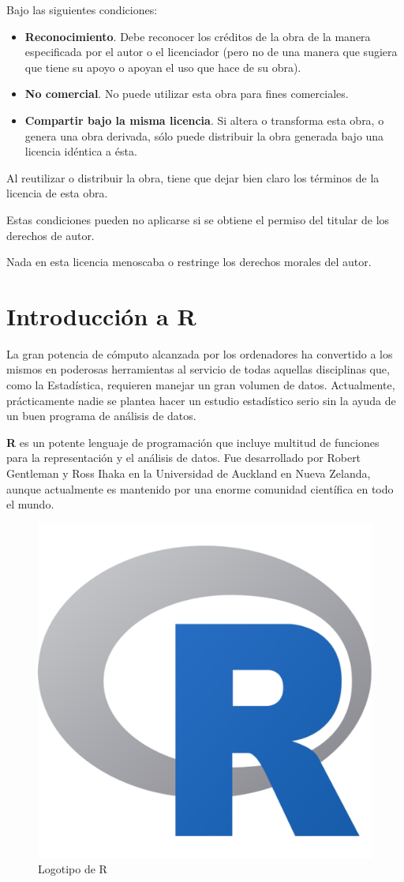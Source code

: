 \documentclass[
  spanish,
  a4paper,
]{scrreport}
\theoremstyle{definition}
\theoremstyle{remark}
\begin{document}
Bajo las siguientes condiciones:

\begin{itemize}
\item
  \textbf{Reconocimiento}. Debe reconocer los créditos de la obra de la
  manera especificada por el autor o el licenciador (pero no de una
  manera que sugiera que tiene su apoyo o apoyan el uso que hace de su
  obra).
\item
  \textbf{No comercial}. No puede utilizar esta obra para fines
  comerciales.
\item
  \textbf{Compartir bajo la misma licencia}. Si altera o transforma esta
  obra, o genera una obra derivada, sólo puede distribuir la obra
  generada bajo una licencia idéntica a ésta.
\end{itemize}

Al reutilizar o distribuir la obra, tiene que dejar bien claro los
términos de la licencia de esta obra.

Estas condiciones pueden no aplicarse si se obtiene el permiso del
titular de los derechos de autor.

Nada en esta licencia menoscaba o restringe los derechos morales del
autor.


\chapter{Introducción a R}\label{introducciuxf3n-a-r}

La gran potencia de cómputo alcanzada por los ordenadores ha convertido
a los mismos en poderosas herramientas al servicio de todas aquellas
disciplinas que, como la Estadística, requieren manejar un gran volumen
de datos. Actualmente, prácticamente nadie se plantea hacer un estudio
estadístico serio sin la ayuda de un buen programa de análisis de datos.

\textbf{R} es un potente lenguaje de programación que incluye multitud
de funciones para la representación y el análisis de datos. Fue
desarrollado por Robert Gentleman y Ross Ihaka en la Universidad de
Auckland en Nueva Zelanda, aunque actualmente es mantenido por una
enorme comunidad científica en todo el mundo.

\begin{figure}[H]

{\centering \includegraphics[width=0.25\linewidth,height=\textheight,keepaspectratio]{img/logos/Rlogo.png}

}

\caption{Logotipo de R}

\end{figure}%
\end{document}
